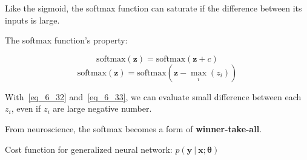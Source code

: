   Like the sigmoid, the softmax function can saturate if the difference between its inputs is large.


  The softmax function's property:

  \begin{equation} \tag{6.32}
    \label{eq_6_32}
    \mathrm{softmax}( \bm{z} ) = \mathrm{softmax}( \bm{z} + c )
  \end{equation}
  \begin{equation} \tag{6.33}
    \label{eq_6_33}
    \mathrm{softmax}( \bm{z} ) = \mathrm{softmax}( \bm{z} - \max _ i (z _ i) )
  \end{equation}

  With~\eqref{eq_6_32} and~\eqref{eq_6_33}, we can evaluate small difference between each $z _ i$, even if $z _ i$ are large negative number.

  From neuroscience, the softmax becomes a form of \textbf{winner-take-all}.


  Cost function for generalized neural network:
  $p( \bm{y} \ |\ \bm{x};\bm{\theta} )$

